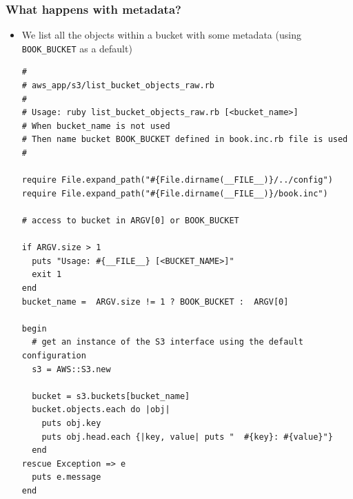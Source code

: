 \documentclass{beamer}
\begin{document}
\begin{frame}
\frametitle{What happens with metadata?}
\begin{itemize}
 \item We list all the objects within a bucket with some metadata (using \texttt{BOOK\_BUCKET} as a default)

\lstset{language=Ruby, style=eclipse}
\begin{lstlisting}
#
# aws_app/s3/list_bucket_objects_raw.rb
#
# Usage: ruby list_bucket_objects_raw.rb [<bucket_name>]
# When bucket_name is not used
# Then name bucket BOOK_BUCKET defined in book.inc.rb file is used
#

require File.expand_path("#{File.dirname(__FILE__)}/../config")
require File.expand_path("#{File.dirname(__FILE__)}/book.inc")

# access to bucket in ARGV[0] or BOOK_BUCKET

if ARGV.size > 1
  puts "Usage: #{__FILE__} [<BUCKET_NAME>]"
  exit 1
end
bucket_name =  ARGV.size != 1 ? BOOK_BUCKET :  ARGV[0]

begin
  # get an instance of the S3 interface using the default configuration
  s3 = AWS::S3.new

  bucket = s3.buckets[bucket_name]
  bucket.objects.each do |obj|
    puts obj.key
    puts obj.head.each {|key, value| puts "  #{key}: #{value}"}
  end
rescue Exception => e
  puts e.message
end
\end{lstlisting}
\end{itemize}

\end{frame}
\end{document}
